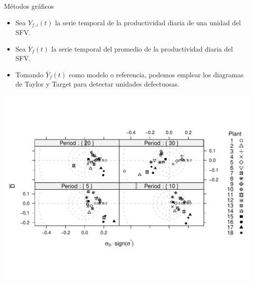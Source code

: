 \documentclass[aspectratio=169, usenames,svgnames,dvipsnames]{beamer}
\begin{document}
\begin{frame}[label={sec:org62fb898}]{Métodos gráficos}
\begin{itemize}
\item Sea \(Y_{f,i}(t)\) la serie temporal de la productividad diaria de una unidad del SFV.
\item Sea \(\overline{Y}_{f}(t)\) la serie temporal del promedio de la productividad diaria del SFV.
\item Tomando \(\overline{Y}_{f}(t)\) como modelo o referencia, podemos emplear los diagramas de Taylor y Target para detectar unidades defectuosas.
\end{itemize}

\begin{center}
\includegraphics[height=0.75\textheight]{../figs/TargetDiagram_Dia120.pdf}
\end{center}
\end{frame}
\end{document}
